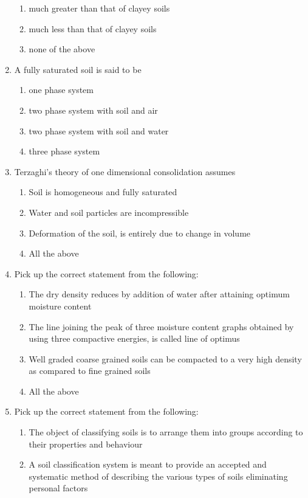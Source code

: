 \documentclass[11pt,a4paper]{article}
\begin{document}
\begin{enumerate}
\begin{enumerate}[label=\Alph*.]
\item{much greater than that of clayey soils}
\item{much less than that of clayey soils}
\item{none of the above}
\end{enumerate}
\item{A fully saturated soil is said to be}
\begin{enumerate}[label=\Alph*.]
\item{one phase system}
\item{two phase system with soil and air}
\item{two phase system with soil and water}
\item{three phase system}
\end{enumerate}
\item{Terzaghi's theory of one dimensional consolidation assumes
}
\begin{enumerate}[label=\Alph*.]
\item{Soil is homogeneous and fully saturated}
\item{Water and soil particles are incompressible}
\item{Deformation of the soil, is entirely due to change in volume}
\item{All the above}
\end{enumerate}
\item{Pick up the correct statement from the following:}
\begin{enumerate}[label=\Alph*.]
\item{The dry density reduces by addition of water after attaining optimum moisture content}
\item{The line joining the peak of three moisture content graphs obtained by using three compactive energies, is called line of optimus}
\item{Well graded coarse grained soils can be compacted to a very high density as compared to fine grained soils}
\item{All the above}
\end{enumerate}
\item{Pick up the correct statement from the following:}
\begin{enumerate}[label=\Alph*.]
\item{The object of classifying soils is to arrange them into groups according to their properties and behaviour}
\item{A soil classification system is meant to provide an accepted and systematic method of describing the various types of soils eliminating personal factors}

\end{enumerate}
\end{enumerate}
\end{document}
